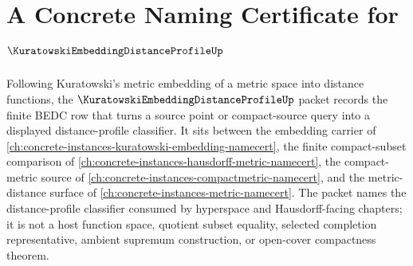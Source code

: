 \chapter{A Concrete Naming Certificate for $\KuratowskiEmbeddingDistanceProfileUp$}
\label{ch:concrete-instances-kuratowski-embedding-distance-profile-namecert}

Following Kuratowski's metric embedding of a metric space into distance functions, the $\KuratowskiEmbeddingDistanceProfileUp$ packet records the finite BEDC row that turns a source point or compact-source query into a displayed distance-profile classifier. It sits between the embedding carrier of \autoref{ch:concrete-instances-kuratowski-embedding-namecert}, the finite compact-subset comparison of \autoref{ch:concrete-instances-hausdorff-metric-namecert}, the compact-metric source of \autoref{ch:concrete-instances-compactmetric-namecert}, and the metric-distance surface of \autoref{ch:concrete-instances-metric-namecert}. The packet names the distance-profile classifier consumed by hyperspace and Hausdorff-facing chapters; it is not a host function space, quotient subset equality, selected completion representative, ambient supremum construction, or open-cover compactness theorem.

